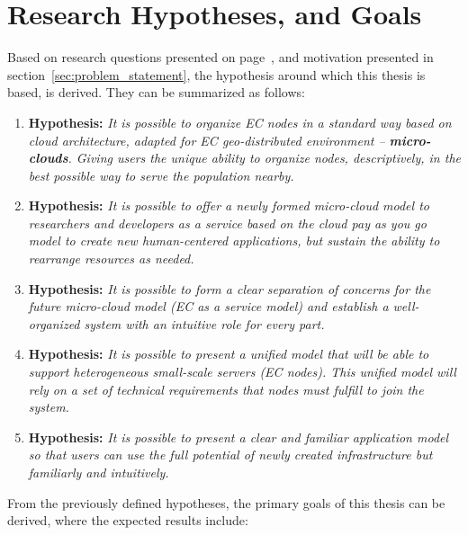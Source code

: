 \section{Research Hypotheses, and Goals}\label{sec:research_hyphotesis_and_golas}
%
Based on research questions presented on page~\pageref{questions}, and motivation presented in section~\ref{sec:problem_statement}, the hypothesis around which this thesis is based, is derived. They can be summarized as follows:

\begin{enumerate}[start=1,label={(\bfseries \arabic*)}]
	\item \textbf{Hypothesis:} \textit{It is possible to organize EC nodes in a standard way based on cloud architecture, adapted for EC geo-distributed environment -- \textbf{micro-clouds}. Giving users the unique ability to organize nodes, descriptively, in the best possible way to serve the population nearby.}
	\item \textbf{Hypothesis:} \textit{It is possible to offer a newly formed micro-cloud model to researchers and developers as a service based on the cloud pay as you go model to create new human-centered applications, but sustain the ability to rearrange resources as needed.}
	\item \textbf{Hypothesis:} \textit{It is possible to form a clear separation of concerns for the future micro-cloud model (EC as a service model) and establish a well-organized system with an intuitive role for every part.} 
	\item \textbf{Hypothesis:} \textit{It is possible to present a unified model that will be able to support heterogeneous small-scale servers (EC nodes). This unified model will rely on a set of technical requirements that nodes must fulfill to join the system.}
	\item \textbf{Hypothesis:} \textit{It is possible to present a clear and familiar application model so that users can use the full potential of newly created infrastructure but familiarly and intuitively.}
\end{enumerate}

\noindent
From the previously defined hypotheses, the primary goals of this thesis can be derived, where the expected results include:


